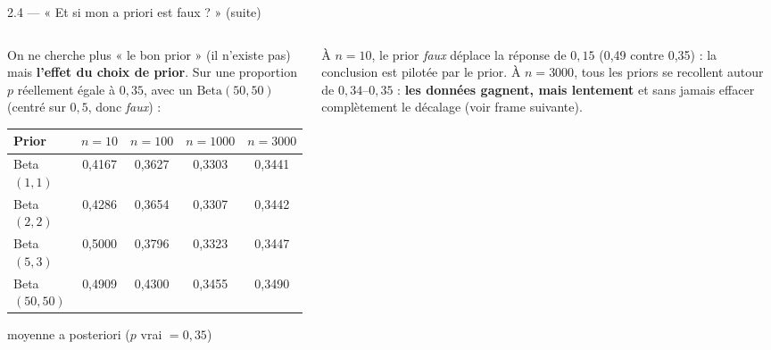 \begin{frame}{2.4 — « Et si mon a priori est faux ? » (suite)}
\begin{columns}[t]
\begin{column}{0.55\textwidth}
\begin{ebox}
On ne cherche plus « le bon prior » (il n'existe pas) mais \textbf{l'effet du choix
de prior}. Sur une proportion $p$ réellement égale à $0{,}35$, avec un
$\mathrm{Beta}(50,50)$ (centré sur $0{,}5$, donc \emph{faux}) :
\begin{center}
\begin{tabular}{@{}lcccc@{}}
\toprule
\textbf{Prior} & $n = 10$ & $n = 100$ & $n = 1000$ & $n = 3000$ \\
\midrule
Beta$(1,1)$   & 0,4167 & 0,3627 & 0,3303 & 0,3441 \\
Beta$(2,2)$   & 0,4286 & 0,3654 & 0,3307 & 0,3442 \\
Beta$(5,3)$   & 0,5000 & 0,3796 & 0,3323 & 0,3447 \\
Beta$(50,50)$ & 0,4909 & 0,4300 & 0,3455 & 0,3490 \\
\bottomrule
\end{tabular}
\end{center}
\hfill\footnotesize moyenne a posteriori ($p$ vrai $= 0{,}35$)
\end{ebox}
\end{column}
\begin{column}{0.42\textwidth}
\begin{wbox}
À $n = 10$, le prior \emph{faux} déplace la réponse de $0{,}15$ (0,49 contre 0,35) :
la conclusion est pilotée par le prior. À $n = 3000$, tous les priors se recollent
autour de $0{,}34$–$0{,}35$ : \textbf{les données gagnent, mais lentement} et sans
jamais effacer complètement le décalage (voir frame suivante).
\end{wbox}
\end{column}
\end{columns}
\end{frame}

